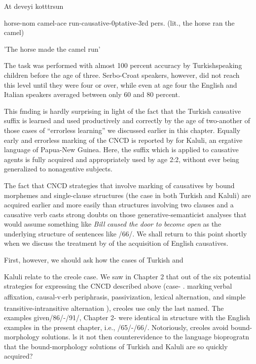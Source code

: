 \ea\label{ex:76}
 At deveyi kotttrsun
\glt
\z

horse-nom camel-ace run-causative-0ptative-3rd pers. (lit., the horse ran the camel)

'The horse made the camel run'

The task was performed with almost 100 percent accuracy by Turkish\-speaking children before the age of three. Serbo-Croat speakers, how\-ever, did not reach this level until they were four or over, while even at age four the English and Italian speakers averaged between only 60 and 80 percent.

This fmding is hardly surprising in light of the fact that the Turkish causative suffix is learned and used productively and correctly by the age of two{}-another of those cases of ``errorless learning'' we discussed earlier in this chapter. Equally early and errorless marking of the CNCD is reported by \citet{Schiefflin1979} for Kaluli, an ergative language of Papua-New Guinea. Here, the suffix which is applied to causative agents is fully acquired and appropriately used by age 2:2, withont ever being generalized to nonagentive subjects.

The fact that CNCD strategies that involve marking of causatives by bound morphemes and single-clause structures (the case in both Turkish and Kaluli) are acquired earlier and more easily than struc\-tures involving two clauses and a causative verb casts strong doubts on those generative-semanticist analyses that would assume something like \textit{Bill} \textit{caused the} \textit{door to} \textit{become} \textit{open} as the underlying structure of sentences like /66/. We shall return to this point shortly when we discuss the treatment by \citet{Bowerman1974} of the acquisition of English causatives.

First, however, we should ask how the cases of Turkish and

Kaluli relate to the creole case. We saw in Chapter 2 that out of the six potential strategies for expressing the CNCD described above (case- . marking\textsubscript{,}verbal affixation, causal{}-v\textsubscript{'}erb periphrasis, passivization, lexical
alternation, and simple transitive-intransitive alternation ), creoles use only the last named. The examples given/86/-/91/, Chapter 2- were identical in structure with the English examples in the present chapter, i.e., /65/-/66/. Notoriously, creoles avoid bound-morphology solutions. ls it not then counterevidence to the language bioprogratn that the bound-morphology solutions of Turkish and Kaluli are so quickly acquired?

